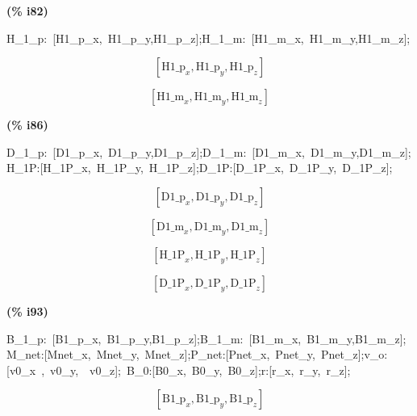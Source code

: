 \documentclass[fleqn]{article}
\begin{document}
\noindent
\begin{minipage}[t]{4.000000em}\color{red}\bfseries
(\% i82)	
\end{minipage}
\begin{minipage}[t]{\textwidth}\color{blue}
H\_1\_p:\ [H1\_p\_x,\ H1\_p\_y,H1\_p\_z];H\_1\_m:\ [H1\_m\_x,\ H1\_m\_y,H1\_m\_z];
\end{minipage}
\[\displaystyle \tag{\% o81} 
\left[ {{\ensuremath{\mathrm{H1\_ p}}}_x}\operatorname{,}{{\ensuremath{\mathrm{H1\_ p}}}_y}\operatorname{,}{{\ensuremath{\mathrm{H1\_ p}}}_z}\right] \mbox{}\]

\[\tag{\% o82} 
\left[ {{\ensuremath{\mathrm{H1\_ m}}}_x}\operatorname{,}{{\ensuremath{\mathrm{H1\_ m}}}_y}\operatorname{,}{{\ensuremath{\mathrm{H1\_ m}}}_z}\right] \mbox{}
\]


\noindent
\begin{minipage}[t]{4.000000em}\color{red}\bfseries
(\% i86)	
\end{minipage}
\begin{minipage}[t]{\textwidth}\color{blue}
D\_1\_p:\ [D1\_p\_x,\ D1\_p\_y,D1\_p\_z];D\_1\_m:\ [D1\_m\_x,\ D1\_m\_y,D1\_m\_z];H\_1P:[H\_1P\_x,\ H\_1P\_y,\ H\_1P\_z];D\_1P:[D\_1P\_x,\ D\_1P\_y,\ D\_1P\_z];
\end{minipage}
\[\displaystyle \tag{\% o83} 
\left[ {{\ensuremath{\mathrm{D1\_ p}}}_x}\operatorname{,}{{\ensuremath{\mathrm{D1\_ p}}}_y}\operatorname{,}{{\ensuremath{\mathrm{D1\_ p}}}_z}\right] \mbox{}\]

\[\tag{\% o84} 
\left[ {{\ensuremath{\mathrm{D1\_ m}}}_x}\operatorname{,}{{\ensuremath{\mathrm{D1\_ m}}}_y}\operatorname{,}{{\ensuremath{\mathrm{D1\_ m}}}_z}\right] \mbox{}\]

\[\tag{\% o85} 
\left[ {{\ensuremath{\mathrm{H\_ 1P}}}_x}\operatorname{,}{{\ensuremath{\mathrm{H\_ 1P}}}_y}\operatorname{,}{{\ensuremath{\mathrm{H\_ 1P}}}_z}\right] \mbox{}\]

\[\tag{\% o86} 
\left[ {{\ensuremath{\mathrm{D\_ 1P}}}_x}\operatorname{,}{{\ensuremath{\mathrm{D\_ 1P}}}_y}\operatorname{,}{{\ensuremath{\mathrm{D\_ 1P}}}_z}\right] \mbox{}
\]


\noindent
\begin{minipage}[t]{4.000000em}\color{red}\bfseries
(\% i93)	
\end{minipage}
\begin{minipage}[t]{\textwidth}\color{blue}
B\_1\_p:\ [B1\_p\_x,\ B1\_p\_y,B1\_p\_z];B\_1\_m:\ [B1\_m\_x,\ B1\_m\_y,B1\_m\_z];M\_net:[Mnet\_x,\ Mnet\_y,\ Mnet\_z];P\_net:[Pnet\_x,\ Pnet\_y,\ Pnet\_z];v\_o:[v0\_x\ ,\ v0\_y,\ \ v0\_z];\ B\_0:[B0\_x,\ B0\_y,\ B0\_z];r:[r\_x,\ r\_y,\ r\_z];
\end{minipage}
\[\displaystyle \tag{\% o87} 
\left[ {{\ensuremath{\mathrm{B1\_ p}}}_x}\operatorname{,}{{\ensuremath{\mathrm{B1\_ p}}}_y}\operatorname{,}{{\ensuremath{\mathrm{B1\_ p}}}_z}\right] \mbox{}\]
\end{document}
